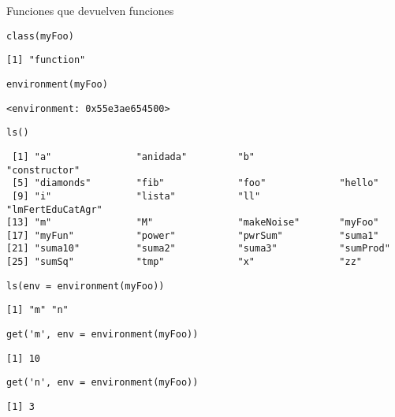 \documentclass[xcolor={usenames,svgnames,dvipsnames}]{beamer}
\begin{document}
\begin{frame}[label={sec:orga959dcb},fragile]{Funciones que devuelven funciones}
 \lstset{language=r,label= ,caption= ,captionpos=b,numbers=none}
\begin{lstlisting}
class(myFoo)
\end{lstlisting}

\begin{verbatim}
[1] "function"
\end{verbatim}


\lstset{language=r,label= ,caption= ,captionpos=b,numbers=none}
\begin{lstlisting}
environment(myFoo)
\end{lstlisting}

\begin{verbatim}
<environment: 0x55e3ae654500>
\end{verbatim}


\lstset{language=r,label= ,caption= ,captionpos=b,numbers=none}
\begin{lstlisting}
ls()
\end{lstlisting}

\begin{verbatim}
 [1] "a"               "anidada"         "b"               "constructor"    
 [5] "diamonds"        "fib"             "foo"             "hello"          
 [9] "i"               "lista"           "ll"              "lmFertEduCatAgr"
[13] "m"               "M"               "makeNoise"       "myFoo"          
[17] "myFun"           "power"           "pwrSum"          "suma1"          
[21] "suma10"          "suma2"           "suma3"           "sumProd"        
[25] "sumSq"           "tmp"             "x"               "zz"
\end{verbatim}


\lstset{language=r,label= ,caption= ,captionpos=b,numbers=none}
\begin{lstlisting}
ls(env = environment(myFoo))
\end{lstlisting}

\begin{verbatim}
[1] "m" "n"
\end{verbatim}


\lstset{language=r,label= ,caption= ,captionpos=b,numbers=none}
\begin{lstlisting}
get('m', env = environment(myFoo))
\end{lstlisting}

\begin{verbatim}
[1] 10
\end{verbatim}


\lstset{language=r,label= ,caption= ,captionpos=b,numbers=none}
\begin{lstlisting}
get('n', env = environment(myFoo))
\end{lstlisting}

\begin{verbatim}
[1] 3
\end{verbatim}
\end{frame}
\end{document}
